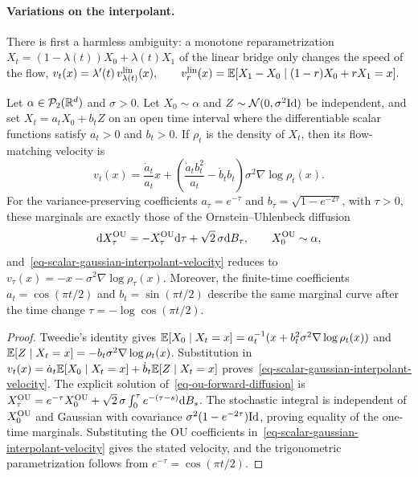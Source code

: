 \paragraph{Variations on the interpolant.}
There is first a harmless ambiguity: a monotone reparametrization $X_t=(1-\lambda(t))X_0+\lambda(t)X_1$ of the linear bridge only changes the speed of the flow,
\(v_t(x)=\lambda'(t)\,v^{\rm lin}_{\lambda(t)}(x), \qquad v^{\rm lin}_{r}(x)=\mathbb{E}[X_1-X_0\mid (1-r)X_0+rX_1=x].\)
\begin{prop}\label{prop-static-ou-equivalence}
Let $\alpha\in\mathcal{P}_2(\mathbb{R}^d)$ and $\sigma>0$. Let $X_0\sim\alpha$ and $Z\sim\mathcal{N}(0,\sigma^2\mathrm{Id})$ be independent, and set $X_t=a_tX_0+b_tZ$ on an open time interval where the differentiable scalar functions satisfy $a_t>0$ and $b_t>0$. If $\rho_t$ is the density of $X_t$, then its flow-matching velocity is
\begin{equation}\label{eq-scalar-gaussian-interpolant-velocity}
v_t(x)=\frac{\dot a_t}{a_t}x+
\left(\frac{\dot a_t b_t^2}{a_t}-\dot b_t b_t\right)\sigma^2\nabla\log \rho_t(x).
\end{equation}
For the variance-preserving coefficients $a_\tau=e^{-\tau}$ and $b_\tau=\sqrt{1-e^{-2\tau}}$, with $\tau>0$, these marginals are exactly those of the Ornstein--Uhlenbeck diffusion
\begin{equation}\label{eq-ou-forward-diffusion}
\mathrm{d} X_\tau^{\rm OU}=-X_\tau^{\rm OU}\mathrm{d}\tau+\sqrt{2}\,\sigma\mathrm{d} B_\tau,
\qquad X_0^{\rm OU}\sim\alpha,
\end{equation}
and~\eqref{eq-scalar-gaussian-interpolant-velocity} reduces to $v_\tau(x)=-x-\sigma^2\nabla\log \rho_\tau(x)$. Moreover, the finite-time coefficients $a_t=\cos(\pi t/2)$ and $b_t=\sin(\pi t/2)$ describe the same marginal curve after the time change $\tau=-\log\cos(\pi t/2)$.
\end{prop}
\begin{proof}
Tweedie's identity gives $\mathbb{E}[X_0\mid X_t=x]=a_t^{-1}(x+b_t^2\sigma^2\nabla\log \rho_t(x))$ and $\mathbb{E}[Z\mid X_t=x]=-b_t\sigma^2\nabla\log \rho_t(x)$. Substitution in $v_t(x)=\dot a_t\mathbb{E}[X_0\mid X_t=x]+\dot b_t\mathbb{E}[Z\mid X_t=x]$ proves~\eqref{eq-scalar-gaussian-interpolant-velocity}. The explicit solution of~\eqref{eq-ou-forward-diffusion} is $X_\tau^{\rm OU}=e^{-\tau}X_0^{\rm OU}+\sqrt{2}\,\sigma\int_0^\tau e^{-(\tau-s)}\mathrm{d} B_s$. The stochastic integral is independent of $X_0^{\rm OU}$ and Gaussian with covariance $\sigma^2(1-e^{-2\tau})\mathrm{Id}$, proving equality of the one-time marginals. Substituting the OU coefficients in~\eqref{eq-scalar-gaussian-interpolant-velocity} gives the stated velocity, and the trigonometric parametrization follows from $e^{-\tau}=\cos(\pi t/2)$.
\end{proof}
